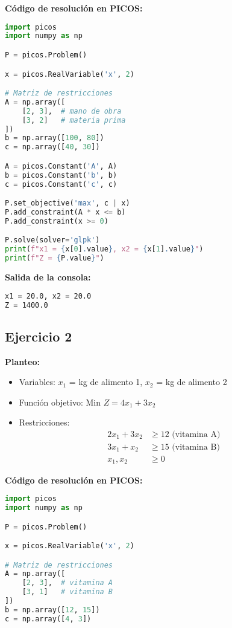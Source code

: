 \documentclass[12pt]{article}
\begin{document}
\begin{enumerate}
\textbf{Código de resolución en PICOS:}
\begin{lstlisting}[language=Python]
import picos
import numpy as np

P = picos.Problem()

x = picos.RealVariable('x', 2)

# Matriz de restricciones
A = np.array([
    [2, 3],  # mano de obra
    [3, 2]   # materia prima
])
b = np.array([100, 80])
c = np.array([40, 30])

A = picos.Constant('A', A)
b = picos.Constant('b', b)
c = picos.Constant('c', c)

P.set_objective('max', c | x)
P.add_constraint(A * x <= b)
P.add_constraint(x >= 0)

P.solve(solver='glpk')
print(f"x1 = {x[0].value}, x2 = {x[1].value}")
print(f"Z = {P.value}")
\end{lstlisting}

\textbf{Salida de la consola:}
\begin{lstlisting}[language=bash,backgroundcolor=\color{black},basicstyle=\color{white}\ttfamily,numbers=none]
x1 = 20.0, x2 = 20.0
Z = 1400.0
\end{lstlisting}

\subsection*{Ejercicio 2}

\textbf{Planteo:}
\begin{itemize}
\item Variables: $x_1$ = kg de alimento 1, $x_2$ = kg de alimento 2
\item Función objetivo: Min $Z = 4x_1 + 3x_2$
\item Restricciones:
  \begin{align*}
  2x_1 + 3x_2 &\geq 12 \text{ (vitamina A)} \\
  3x_1 + x_2 &\geq 15 \text{ (vitamina B)} \\
  x_1, x_2 &\geq 0
  \end{align*}
\end{itemize}

\textbf{Código de resolución en PICOS:}
\begin{lstlisting}[language=Python]
import picos
import numpy as np

P = picos.Problem()

x = picos.RealVariable('x', 2)

# Matriz de restricciones
A = np.array([
    [2, 3],  # vitamina A
    [3, 1]   # vitamina B
])
b = np.array([12, 15])
c = np.array([4, 3])


\end{lstlisting}
\end{enumerate}
\end{document}
